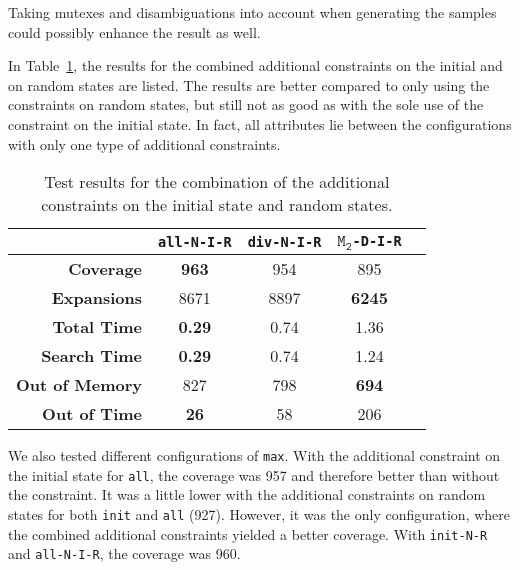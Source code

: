 Taking mutexes and disambiguations into account when generating the samples could possibly enhance the result as well.

In Table~\ref{table:initial-random-samples-constraint}, the results for the combined additional constraints on the initial and on random states are listed.
The results are better compared to only using the constraints on random states, but still not as good as with the sole use of the constraint on the initial state.
In fact, all attributes lie between the configurations with only one type of additional constraints.

\begin{table}[h!]
    \begin{center}
        \begin{tabular}{|r|c|c|c|c|}
            \hline
            & \textbf{\texttt{all-N-I-R}} & \textbf{\texttt{div-N-I-R}} & \textbf{$\texttt{M}_\texttt{2}$\texttt{-D-I-R}} \\
            \hline \hline
            \textbf{Coverage}       & \textbf{963}  & 954  & 895   \\ \hline
            \textbf{Expansions}     & 8671          & 8897 & \textbf{6245}   \\ \hline
            \textbf{Total Time}     & \textbf{0.29} & 0.74 & 1.36  \\ \hline
            \textbf{Search Time}    & \textbf{0.29} & 0.74 & 1.24  \\ \hline
            \textbf{Out of Memory}  & 827           & 798  & \textbf{694}   \\ \hline
            \textbf{Out of Time}    & \textbf{26}   & 58   & 206   \\ \hline
        \end{tabular}
        \caption{ Test results for the combination of the additional constraints on the initial state and random states.}
        \label{table:initial-random-samples-constraint}
    \end{center}
\end{table}

We also tested different configurations of \texttt{max}.
With the additional constraint on the initial state for \texttt{all}, the coverage was 957 and therefore better than without the constraint.
It was a little lower with the additional constraints on random states for both \texttt{init} and \texttt{all} (927).
However, it was the only configuration, where the combined additional constraints yielded a better coverage.
With \texttt{init-N-R} and \texttt{all-N-I-R}, the coverage was 960.

